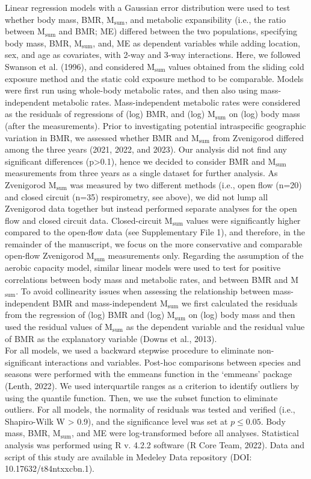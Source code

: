 \documentclass[10pt, twoside]{book} %
\begin{document}
Linear regression models with a Gaussian error distribution were used to test whether body mass, BMR, M$_{\text{sum}}$, and metabolic expansibility (i.e., the ratio between M$_{\text{sum}}$ and BMR; ME) differed between the two populations, specifying body mass, BMR, M$_{\text{sum}}$, and, ME as dependent variables while adding location, sex, and age as covariates, with 2-way and 3-way interactions. Here, we followed Swanson et al. (1996), and considered M$_{\text{sum}}$ values obtained from the sliding cold exposure method and the static cold exposure method to be comparable. Models were first run using whole-body metabolic rates, and then also using mass-independent metabolic rates. Mass-independent metabolic rates were considered as the residuals of regressions of (log) BMR, and (log) M$_{\text{sum}}$ on (log) body mass (after the measurements). Prior to investigating potential intraspecific geographic variation in BMR, we assessed whether BMR and M$_{\text{sum}}$ from Zvenigorod differed among the three years (2021, 2022, and 2023). Our analysis did not find any significant differences (p>0.1), hence we decided to consider BMR and M$_{\text{sum}}$ measurements from three years as a single dataset for further analysis. As Zvenigorod M$_{\text{sum}}$ was measured by two different methods (i.e., open flow (n=20) and closed circuit (n=35) respirometry, see above), we did not lump all Zvenigorod data together but instead performed separate analyses for the open flow and closed circuit data. Closed-circuit M$_{\text{sum}}$ values were significantly higher compared to the open-flow data (see Supplementary File 1), and therefore, in the remainder of the manuscript, we focus on the more conservative and comparable open-flow Zvenigorod M$_{\text{sum}}$ measurements only. Regarding the assumption of the aerobic capacity model, similar linear models were used to test for positive correlations between body mass and metabolic rates, and between BMR and M$_{\text{sum}}$. To avoid collinearity issues when assessing the relationship between mass-independent BMR and mass-independent M$_{\text{sum}}$ we first calculated the residuals from the regression of (log) BMR and (log) M$_{\text{sum}}$ on (log) body mass and then used the residual values of M$_{\text{sum}}$ as the dependent variable and the residual value of BMR as the explanatory variable (Downs et al., 2013).\\

For all models, we used a backward stepwise procedure to eliminate non-significant interactions and variables. Post-hoc comparisons between species and seasons were performed with the emmeans function in the ‘emmeans’ package (Lenth, 2022). We used interquartile ranges as a criterion to identify outliers by using the quantile function. Then, we use the subset function to eliminate outliers. For all models, the normality of residuals was tested and verified (i.e., Shapiro-Wilk W > 0.9), and the significance level was set at $p \leq 0.05$. Body mass, BMR, M$_{\text{sum}}$, and ME were log-transformed before all analyses. Statistical analysis was performed using R v. 4.2.2 software (R Core Team, 2022). Data and script of this study are available in Medeley Data repository (DOI: 10.17632/t84ntxxcbn.1).\\
\end{document}
